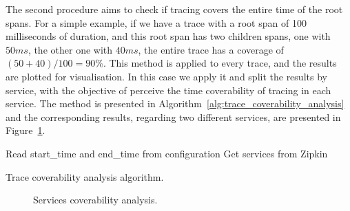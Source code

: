 The second procedure aims to check if tracing covers the entire time of the root spans. For a simple example, if we have a trace with a root span of 100 milliseconds of duration, and this root span has two children spans, one with $50ms$, the other one with $40ms$, the entire trace has a coverage of $(50+40)/100=90\%$. This method is applied to every trace, and the results are plotted for visualisation. In this case we apply it and split the results by service, with the objective of perceive the time coverability of tracing in each service. The method is presented in Algorithm~\ref{alg:trace_coverability_analysis} and the corresponding results, regarding two different services, are presented in Figure~\ref{fig:services_coverability_analysis}.

\begin{algorithm}
  Read start\_time and end\_time from configuration\;
  Get services from Zipkin\;
  \caption{Trace coverability analysis algorithm.}
  \label{alg:trace_coverability_analysis}
\end{algorithm}

\begin{figure}
  \caption{Services coverability analysis.}
  \label{fig:services_coverability_analysis}
\end{figure}

